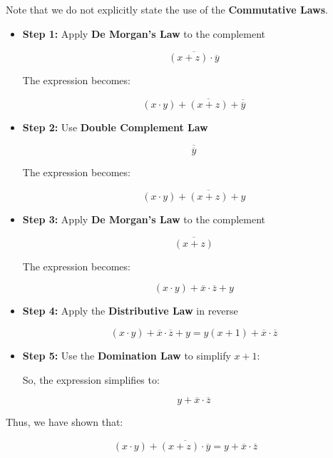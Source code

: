 \begin{solution}

    Note that we do not explicitly state the use of the \textbf{Commutative Laws}.

    \begin{itemize}

        \item \textbf{Step 1:} Apply \textbf{De Morgan's Law} to the complement
        
        \[ \overline{(x + z) \cdot \overline{y}} \]
        
        The expression becomes:
        
        \[
        (x \cdot y) + \overline{(x + z)} + \overline{\overline{y}}
        \]
        
        \item \textbf{Step 2:} Use \textbf{Double Complement Law}
        
        \[
        \overline{\overline{y}}
        \]
        
        The expression becomes:

         \[
        (x \cdot y) + \overline{(x + z)} + y
        \]
        
        \item \textbf{Step 3:} Apply \textbf{De Morgan's Law} to the complement
             
        \[
        \overline{(x + z)}
        \]
        
        The expression becomes:

        \[
       (x \cdot y) + \overline{x} \cdot \overline{z} + y
       \]
        
        \item \textbf{Step 4:} Apply the \textbf{Distributive Law} in reverse
        
        \[
        (x \cdot y) + \overline{x} \cdot \overline{z} + y = y (x + 1) + \overline{x} \cdot \overline{z}
        \]
        
        \item \textbf{Step 5:} Use the \textbf{Domination Law} to simplify \( x + 1 \):
        
        So, the expression simplifies to:
        
        \[
        y + \overline{x} \cdot \overline{z}
        \]
        
    \end{itemize}
    
    Thus, we have shown that:
    
    \[
    (x \cdot y) + \overline{(x + z) \cdot \overline{y}} = y + \overline{x} \cdot \overline{z}
    \]
    

\end{solution}

